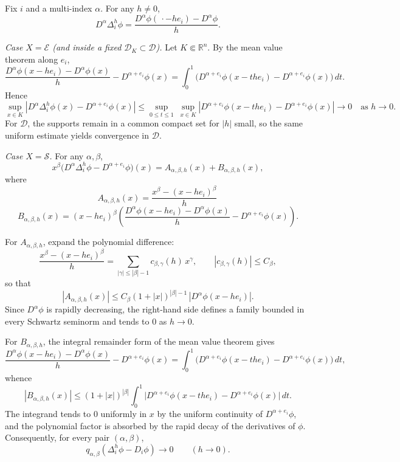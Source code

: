 \documentclass[12pt,a4paper]{article}
\theoremstyle{plain}
\theoremstyle{definition}
\theoremstyle{remark}
\theoremstyle{remark}
\begin{document}
\bigskip

Fix $i$ and a multi-index $\alpha$. For any $h\neq 0$,
\[
D^\alpha\Delta_i^{h}\phi
=\frac{D^\alpha\phi(\,\cdot-h e_i)-D^\alpha\phi}{h}.
\]

\medskip

\textit{Case $X=\mathcal E$ (and inside a fixed $\mathcal D_K\subset\mathcal D$).}
Let $K\Subset\mathbb R^n$. By the mean value theorem along $e_i$,
\[
\frac{D^\alpha\phi(x-he_i)-D^\alpha\phi(x)}{h}-D^{\alpha+e_i}\phi(x)
=\int_0^1\big(D^{\alpha+e_i}\phi(x-th e_i)-D^{\alpha+e_i}\phi(x)\big)\,dt.
\]
Hence
\[
\sup_{x\in K}\left|D^\alpha\Delta_i^h\phi(x)-D^{\alpha+e_i}\phi(x)\right|
\le \sup_{0\le t\le 1}\ \sup_{x\in K}
\left|D^{\alpha+e_i}\phi(x-th e_i)-D^{\alpha+e_i}\phi(x)\right|
\longrightarrow 0 \quad \text{as } h\to 0.
\]
For $\mathcal D$, the supports remain in a common compact set for $|h|$ small, so the same uniform estimate yields convergence in $\mathcal D$.

\bigskip

\textit{Case $X=\mathcal S$.}
For any $\alpha,\beta$,
\[
x^\beta\big(D^\alpha\Delta_i^{h}\phi-D^{\alpha+e_i}\phi\big)(x)
= A_{\alpha,\beta,h}(x)+B_{\alpha,\beta,h}(x),
\]
where
\[
A_{\alpha,\beta,h}(x)
=\frac{x^\beta-(x-he_i)^\beta}{h}\,
\]
\[
B_{\alpha,\beta,h}(x)
=(x-he_i)^\beta\!\left(\frac{D^\alpha\phi(x-he_i)-D^\alpha\phi(x)}{h}-D^{\alpha+e_i}\phi(x)\right).
\]
\medskip

For $A_{\alpha,\beta,h}$, expand the polynomial difference:
\[
\frac{x^\beta-(x-he_i)^\beta}{h}
=\sum_{|\gamma|\le |\beta|-1} c_{\beta,\gamma}(h)\,x^\gamma, \qquad |c_{\beta,\gamma}(h)|\le C_\beta,
\]
so that
\[
|A_{\alpha,\beta,h}(x)|
\le C_\beta (1+|x|)^{|\beta|-1}\,|D^\alpha\phi(x-he_i)|.
\]
Since $D^\alpha\phi$ is rapidly decreasing, the right-hand side defines a family bounded in every Schwartz seminorm and tends to $0$ as $h\to0$.

\medskip

For $B_{\alpha,\beta,h}$, the integral remainder form of the mean value theorem gives
\[
\frac{D^\alpha\phi(x-he_i)-D^\alpha\phi(x)}{h}-D^{\alpha+e_i}\phi(x)
=\int_0^1\!\big(D^{\alpha+e_i}\phi(x-th e_i)-D^{\alpha+e_i}\phi(x)\big)\,dt,
\]
whence
\[
|B_{\alpha,\beta,h}(x)|
\le (1+|x|)^{|\beta|}\int_0^1
\big|D^{\alpha+e_i}\phi(x-th e_i)-D^{\alpha+e_i}\phi(x)\big|\,dt.
\]
The integrand tends to $0$ uniformly in $x$ by the uniform continuity of $D^{\alpha+e_i}\phi$, and the polynomial factor is absorbed by the rapid decay of the derivatives of $\phi$. Consequently, for every pair $(\alpha,\beta)$,
\[
q_{\alpha,\beta}(\Delta_i^{h}\phi-D_i\phi)\longrightarrow 0 \qquad (h\to0).
\]
\end{document}
